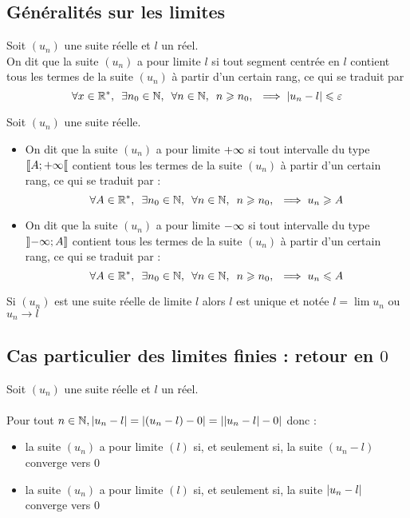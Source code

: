 \subsection{Généralités sur les limites}
\begin{defprop}
    Soit \((u_n)\) une suite réelle et \(l\) un réel. \\
    On dit que la suite \((u_n)\) a pour limite \(l\) si tout segment centrée en \(l\) contient tous les termes de la suite \((u_n)\) à partir d'un certain rang, ce qui se traduit par
    \[\quantifs{\forall x \in \Rs;\exists n_0 \in \N; \forall n \in \N;n\geq n_0} \imp \abs{u_n - l}\leq \epsilon\]
\end{defprop}
\begin{defprop}
    Soit \((u_n)\) une suite réelle. \\
    \begin{itemize}
        \item On dit que la suite \((u_n)\) a pour limite \(+\infty\) si tout intervalle du type \(\left\llbracket A;+\infty\right\llbracket\) contient tous les termes de la suite \((u_n)\) à partir d'un certain rang, ce qui se traduit par :
        \[\quantifs{\forall A \in \Rs;\exists n_0 \in \N; \forall n \in \N; n \geq n_0} \imp u_n \geq A\]
        \item On dit que la suite \((u_n)\) a pour limite \(-\infty\) si tout intervalle du type \(\left\rrbracket-\infty;A\right\rrbracket\) contient tous les termes de la suite \((u_n)\) à partir d'un certain rang, ce qui se traduit par :
        \[\quantifs{\forall A \in \Rs;\exists n_0 \in \N; \forall n \in \N; n \geq n_0} \imp u_n \leq A\]
    \end{itemize}
\end{defprop}

\begin{prop}
    Si \((u_n)\) est une suite réelle de limite \(l\) alors \(l\) est unique et notée \(l = \lim u_n \) ou \(u_n \to l\)
\end{prop}

\subsection{Cas particulier des limites finies : retour en \(0\)}
\begin{defprop}
    Soit \((u_n)\) une suite réelle et \(l\) un réel. \\~\\
    Pour tout \( n \in \mathbb{N}, \left\lvert u_n -l\right\rvert = \left\lvert\left(u_n - l\right)-0\right\rvert = \left\lvert\left\lvert u_n - l\right\rvert-0\right\rvert\) donc : \\
    \begin{itemize}
        \item la suite \((u_n)\) a pour limite \((l)\) si, et seulement si, la suite \((u_n - l)\) converge vers \(0\) \\
        \item la suite \((u_n)\) a pour limite \((l)\) si, et seulement si, la suite \(\left\lvert u_n - l\right\rvert\) converge vers \(0\)
    \end{itemize}
\end{defprop}

